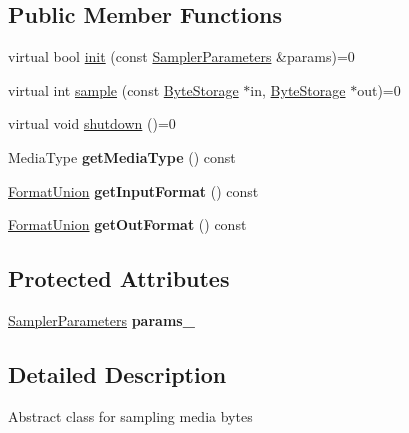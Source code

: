 \subsection*{Public Member Functions}
\begin{DoxyCompactItemize}
\item 
virtual bool \hyperlink{classffmpeg_1_1MediaSampler_a049962d62fc930c67d6cf5aa89ae1948}{init} (const \hyperlink{structffmpeg_1_1SamplerParameters}{Sampler\+Parameters} \&params)=0
\item 
virtual int \hyperlink{classffmpeg_1_1MediaSampler_a1e13816018edada455769f027cf5e9dd}{sample} (const \hyperlink{classffmpeg_1_1ByteStorage}{Byte\+Storage} $\ast$in, \hyperlink{classffmpeg_1_1ByteStorage}{Byte\+Storage} $\ast$out)=0
\item 
virtual void \hyperlink{classffmpeg_1_1MediaSampler_ac8f2fee9cdf896871776a8202d70edd7}{shutdown} ()=0
\item 
\mbox{\label{classffmpeg_1_1MediaSampler_a1cd72cd87a71104774fe6a6cb93147cf}} 
Media\+Type {\bfseries get\+Media\+Type} () const
\item 
\mbox{\label{classffmpeg_1_1MediaSampler_ac2425258ae9c27b4d64e5ab2e3770515}} 
\hyperlink{unionffmpeg_1_1FormatUnion}{Format\+Union} {\bfseries get\+Input\+Format} () const
\item 
\mbox{\label{classffmpeg_1_1MediaSampler_a38aec851b7b3241dcdc6142e9b05ba2f}} 
\hyperlink{unionffmpeg_1_1FormatUnion}{Format\+Union} {\bfseries get\+Out\+Format} () const
\end{DoxyCompactItemize}
\subsection*{Protected Attributes}
\begin{DoxyCompactItemize}
\item 
\mbox{\label{classffmpeg_1_1MediaSampler_ac95cc63a7f41b4e47c8071b622dc5872}} 
\hyperlink{structffmpeg_1_1SamplerParameters}{Sampler\+Parameters} {\bfseries params\+\_\+}
\end{DoxyCompactItemize}


\subsection{Detailed Description}
Abstract class for sampling media bytes 

